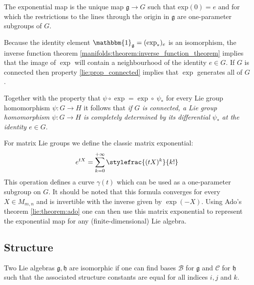 	\begin{property}
		The exponential map is the unique map $\mathfrak{g}\rightarrow G$ such that exp$(0) = e$ and for which the restrictions to the lines through the origin in $\mathfrak{g}$ are one-parameter subgroups of $G$.
	\end{property}
	\begin{result}
		Because the identity element $\mathbbm{1}_\mathfrak{g} = (\exp_\ast)_e$ is an isomorphism, the inverse function theorem \ref{manifolds:theorem:inverse_function_theorem} implies that the image of $\exp$ will contain a neighbourhood of the identity $e\in G$. If $G$ is connected then property \ref{lie:prop_connected} implies that $\exp$ generates all of $G$.
		
		Together with the property that $\psi\circ\exp = \exp\circ\ \psi_\ast$ for every Lie group homomorphism $\psi:G\rightarrow H$ it follows that \textit{if $G$ is connected, a Lie group homomorphism $\psi:G\rightarrow H$ is completely determined by its differential $\psi_\ast$ at the identity $e\in G$}.
	\end{result}
	
	\begin{example}
		For matrix Lie groups we define the classic matrix exponential:
		\begin{equation}
			e^{tX} = \sum_{k=0}^{+\infty}\stylefrac{(tX)^k}{k!}
		\end{equation}
		This operation defines a curve $\gamma(t)$ which can be used as a one-parameter subgroup on $G$. It should be noted that this formula converges for every $X\in M_{m,n}$ and is invertible with the inverse given by $\exp(-X)$. Using Ado's theorem \ref{lie:theorem:ado} one can then use this matrix exponential to represent the exponential map for any (finite-dimensional) Lie algebra.
	\end{example}

\subsection{Structure}  
        
        \begin{property}
        	Two Lie algebras $\mathfrak{g}, \mathfrak{h}$ are isomorphic if one can find bases $\mathcal{B}$ for $\mathfrak{g}$ and $\mathcal{C}$ for $\mathfrak{h}$ such that the associated structure constants are equal for all indices $i, j$ and $k$.
        \end{property}

